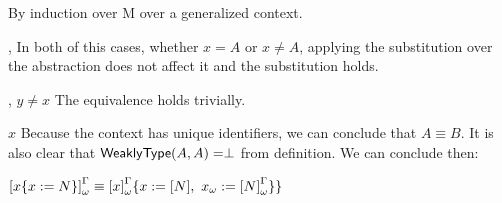 \begin{Proof} By induction over M over a generalized context.

\begin{ProofCase}{\M{} \termDef{} \Type{}, \M{} \termDef{} \Prop{}}
In both of this cases, whether $x = A$ or $x \neq A$,
applying the substitution over the abstraction does not affect it and the substitution holds.
\end{ProofCase}

\begin{ProofCase}{\M{} \termDef{} \y{}, $y \neq x$}
The equivalence holds trivially.
\end{ProofCase}

\begin{ProofCase}{\M{} \termDef{} $x$}
Because the context has unique identifiers, we can conclude that 
$A\equiv B$. It is also clear that $\weaklypropFun[A,A]\termEq\False$ from definition.
We can conclude then:
\begin{center}
$\WParamTrans{\subst{x}{x}{N}}\equiv\subst{\WParamTrans{x}}{x}{\Trans{N}}{\WTermTrans{x}}{\WParamTrans{N}\}}$
\end{center}

\end{ProofCase}


\end{Proof}
